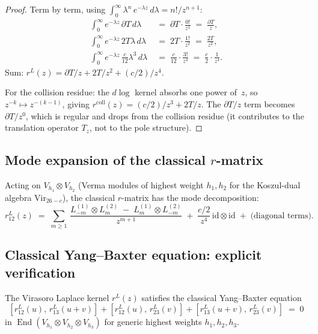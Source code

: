 \documentclass[11pt]{article}
\newcommand{\id}{\mathrm{id}}
\newcommand{\End}{\operatorname{End}}
\begin{document}
\begin{proof}
Term by term, using $\int_0^\infty \lambda^n\,e^{-\lambda z}\,d\lambda
= n!/z^{n+1}$:
\begin{align*}
\int_0^\infty e^{-\lambda z}\,\partial T\,d\lambda
&\;=\;
\partial T \cdot \frac{0!}{z^1}
\;=\;
\frac{\partial T}{z},\\
\int_0^\infty e^{-\lambda z}\,2T\lambda\,d\lambda
&\;=\;
2T \cdot \frac{1!}{z^2}
\;=\;
\frac{2T}{z^2},\\
\int_0^\infty e^{-\lambda z}\,\frac{c}{12}\lambda^3\,d\lambda
&\;=\;
\frac{c}{12}\cdot\frac{3!}{z^4}
\;=\;
\frac{c}{2}\cdot\frac{1}{z^4}.
\end{align*}
Sum: $r^L(z) = \partial T/z + 2T/z^2 + (c/2)/z^4$.

For the collision residue: the $d\log$ kernel absorbs one power of~$z$,
so $z^{-k} \mapsto z^{-(k-1)}$, giving
$r^{\mathrm{coll}}(z) = (c/2)/z^3 + 2T/z$.
The $\partial T/z$ term becomes $\partial T/z^0$, which is regular
and drops from the collision residue (it contributes to the
translation operator $T_z$, not to the pole structure).
\end{proof}

\subsection{Mode expansion of the classical $r$-matrix}

Acting on
$V_{h_1} \otimes V_{h_2}$ (Verma modules of highest weight $h_1, h_2$
for the Koszul-dual algebra $\mathrm{Vir}_{26-c}$), the classical
$r$-matrix has the mode decomposition:
\begin{equation}\label{eq:rL-mode-expansion-R}
r^L_{12}(z)
\;=\;
\sum_{m \ge 1}\,
\frac{L_{-m}^{(1)} \otimes L_m^{(2)}
\;-\;
L_m^{(1)} \otimes L_{-m}^{(2)}}{z^{m+1}}
\;+\;
\frac{c/2}{z^4}\,\id \otimes \id
\;+\;
\text{(diagonal terms)}.
\end{equation}

\subsection{Classical Yang--Baxter equation: explicit verification}
\label{subsec:cybe-vir-R}

\begin{theorem}
\label{thm:vir-cybe-R}
The Virasoro Laplace kernel $r^L(z)$ satisfies the classical
Yang--Baxter equation
\begin{equation}\label{eq:cybe-R}
[r^L_{12}(u),\, r^L_{13}(u+v)]
+ [r^L_{12}(u),\, r^L_{23}(v)]
+ [r^L_{13}(u+v),\, r^L_{23}(v)]
\;=\; 0
\end{equation}
in $\End(V_{h_1} \otimes V_{h_2} \otimes V_{h_3})$ for generic
highest weights $h_1, h_2, h_3$.
\end{theorem}
\end{document}
